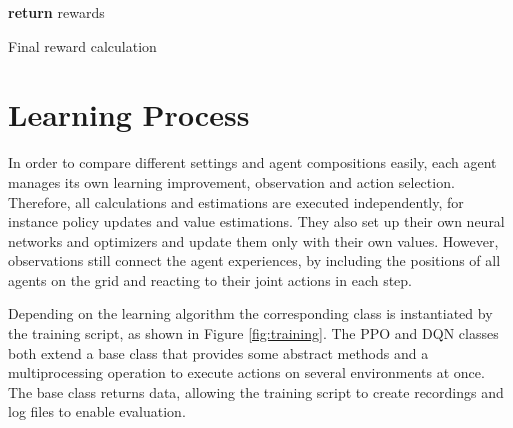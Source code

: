 \begin{algorithm}[H]
    \DontPrintSemicolon
    \textbf{return} rewards\;
    \caption{Final reward calculation}\label{algo:final_reward}
\end{algorithm}

\section{Learning Process}\label{learning_process}
In order to compare different settings and agent compositions easily, each agent manages its own learning improvement, observation and action selection. Therefore, all calculations and estimations are executed independently, for instance policy updates and value estimations. They also set up their own neural networks and optimizers and update them only with their own values. However, observations still connect the agent experiences, by including the positions of all agents on the grid and reacting to their joint actions in each step.

Depending on the learning algorithm the corresponding class is instantiated by the training script, as shown in Figure \ref{fig:training}. The PPO and DQN classes both extend a base class that provides some abstract methods and a multiprocessing operation to execute actions on several environments at once. The base class returns data, allowing the training script to create recordings and log files to enable evaluation.


